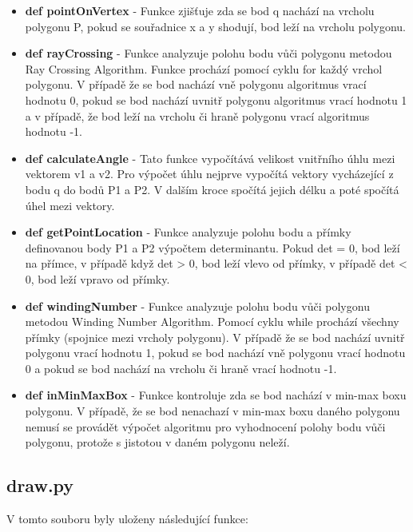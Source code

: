 \documentclass[12pt, a4paper]{article}
\begin{document}
\begin{itemize}
    \item \textbf{def pointOnVertex} - Funkce zjišťuje zda se bod q nachází na vrcholu polygonu P, pokud se souřadnice x a y shodují, bod leží na vrcholu polygonu.
    \item \textbf{def rayCrossing} - Funkce analyzuje polohu bodu vůči polygonu metodou Ray Crossing Algorithm. Funkce prochází pomocí cyklu for každý vrchol polygonu. V případě že se bod nachází vně polygonu algoritmus vrací hodnotu 0, pokud se bod nachází uvnitř polygonu algoritmus vrací hodnotu 1 a v případě, že bod leží na vrcholu či hraně polygonu vrací algoritmus hodnotu -1. 
    \item \textbf{def calculateAngle} - Tato funkce vypočítává velikost vnitřního úhlu mezi vektorem v1 a v2. Pro výpočet úhlu nejprve vypočítá vektory vycházející z bodu q do bodů P1 a P2. V dalším kroce spočítá jejich délku a poté spočítá úhel mezi vektory. 
    \item \textbf{def getPointLocation} - Funkce analyzuje polohu bodu a přímky definovanou body P1 a P2 výpočtem determinantu. Pokud det = 0, bod leží na přímce, v případě když det > 0, bod leží vlevo od přímky, v případě det < 0, bod leží vpravo od přímky.
    \item \textbf{def windingNumber} - Funkce analyzuje polohu bodu vůči polygonu metodou Winding Number Algorithm. Pomocí cyklu while prochází všechny přímky (spojnice mezi vrcholy polygonu). V případě že se bod nachází uvnitř polygonu vrací hodnotu 1, pokud se bod nachází vně polygonu vrací hodnotu 0 a pokud se bod nachází na vrcholu či hraně vrací hodnotu -1. 
    \item \textbf{def inMinMaxBox} - Funkce kontroluje zda se bod nachází v min-max boxu polygonu. V případě, že se bod nenachazí v min-max boxu daného polygonu nemusí se provádět výpočet algoritmu pro vyhodnocení polohy bodu vůči polygonu, protože s jistotou v daném polygonu neleží. 
\end{itemize}

\vspace{5mm}
\subsection*{draw.py}
\vspace{3mm}
V tomto souboru byly uloženy následující funkce:
\vspace{3mm}
\end{document}

